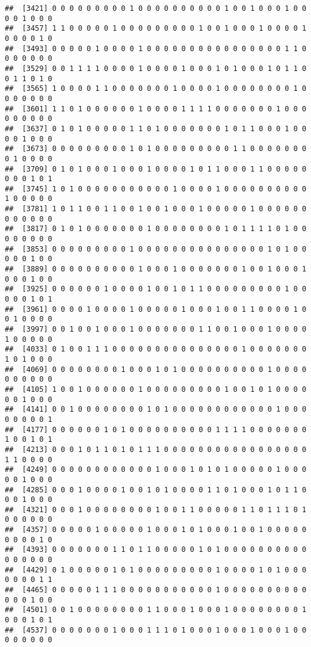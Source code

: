 \documentclass[
]{article}
\begin{document}
\begin{verbatim}
##  [3421] 0 0 0 0 0 0 0 0 0 1 0 0 0 0 0 0 0 0 0 0 1 0 0 1 0 0 0 1 0 0 0 0 1 0 0 0
##  [3457] 1 1 0 0 0 0 0 1 0 0 0 0 0 0 0 0 0 1 0 0 1 0 0 0 1 0 0 0 0 1 0 0 0 0 1 0
##  [3493] 0 0 0 0 0 1 0 0 0 0 1 0 0 0 0 0 0 0 0 0 0 0 0 0 0 0 0 1 1 0 0 0 0 0 0 0
##  [3529] 0 0 1 1 1 1 0 0 0 0 1 0 0 0 0 1 0 0 0 1 0 1 0 0 0 1 0 1 1 0 0 1 1 0 1 0
##  [3565] 1 0 0 0 0 1 1 0 0 0 0 0 0 0 1 0 0 0 0 1 0 0 0 0 0 0 0 0 1 0 0 0 0 0 0 0
##  [3601] 1 1 0 1 0 0 0 0 0 0 1 0 0 0 0 1 1 1 1 0 0 0 0 0 0 0 1 0 0 0 0 0 0 0 0 0
##  [3637] 0 1 0 1 0 0 0 0 0 1 1 0 1 0 0 0 0 0 0 0 1 0 1 1 0 0 0 1 0 0 0 0 1 0 0 0
##  [3673] 0 0 0 0 0 0 0 0 0 1 0 1 0 0 0 0 0 0 0 0 0 1 1 0 0 0 0 0 0 0 0 1 0 0 0 0
##  [3709] 0 1 0 1 0 0 0 1 0 0 0 1 0 0 0 0 1 0 1 1 0 0 0 1 1 0 0 0 0 0 0 0 0 1 0 1
##  [3745] 1 0 1 0 0 0 0 0 0 0 0 0 0 0 1 0 0 0 0 1 0 0 0 0 0 0 0 0 0 0 1 0 0 0 0 0
##  [3781] 1 0 1 1 0 0 1 1 0 0 1 0 0 1 0 0 0 1 0 0 0 0 0 1 0 0 0 0 0 0 0 0 0 0 0 0
##  [3817] 0 1 0 1 0 0 0 0 0 0 0 1 0 0 0 0 0 0 0 0 1 0 1 1 1 1 0 1 0 0 0 0 0 0 0 0
##  [3853] 0 0 0 0 0 0 0 0 0 1 0 0 0 0 0 0 0 0 0 0 0 0 0 0 0 1 0 1 0 0 0 0 0 1 0 0
##  [3889] 0 0 0 0 0 0 0 0 0 0 1 0 0 0 1 0 0 0 0 0 0 0 1 0 0 1 0 0 0 1 0 0 0 1 0 0
##  [3925] 0 0 0 0 0 0 1 0 0 0 0 1 0 0 1 0 1 1 0 0 0 0 0 0 0 0 0 1 0 0 0 0 0 1 0 1
##  [3961] 0 0 0 0 1 0 0 0 0 1 0 0 0 0 0 1 0 0 0 1 0 0 1 1 0 0 0 0 1 0 0 1 0 0 0 0
##  [3997] 0 0 1 0 0 1 0 0 0 1 0 0 0 0 0 0 0 1 1 0 0 1 0 0 0 1 0 0 0 0 1 0 0 0 0 0
##  [4033] 0 1 0 0 1 1 1 0 0 0 0 0 0 0 0 0 0 0 0 0 0 0 1 0 0 0 0 0 0 0 1 0 1 0 0 0
##  [4069] 0 0 0 0 0 0 0 0 1 0 0 0 1 0 1 0 0 0 0 0 0 0 0 0 0 1 0 0 0 0 0 0 0 0 0 0
##  [4105] 1 0 0 1 0 0 0 0 0 0 1 0 0 0 0 0 0 0 0 0 1 0 0 1 0 1 0 0 0 0 0 0 1 0 0 0
##  [4141] 0 0 1 0 0 0 0 0 0 0 0 1 0 1 0 0 0 0 0 0 0 0 0 0 0 0 1 0 0 0 0 0 0 0 0 1
##  [4177] 0 0 0 0 0 0 1 0 1 0 0 0 0 0 0 0 0 0 0 1 1 1 1 0 0 0 0 0 0 0 1 0 0 1 0 1
##  [4213] 0 0 0 1 0 1 1 0 1 0 1 1 1 0 0 0 0 0 0 0 0 0 0 0 0 0 0 0 0 0 1 1 0 0 0 0
##  [4249] 0 0 0 0 0 0 0 0 0 0 0 0 1 0 0 0 1 0 1 0 1 0 0 0 0 0 1 0 0 0 0 0 1 0 0 0
##  [4285] 0 0 0 1 0 0 0 0 1 0 0 1 0 1 0 0 0 0 1 1 0 1 0 0 0 1 0 1 1 0 0 0 1 0 0 0
##  [4321] 0 0 0 1 0 0 0 0 0 0 0 0 1 0 0 1 1 0 0 0 0 0 1 1 0 1 1 1 0 1 0 0 0 0 0 0
##  [4357] 0 0 0 0 0 1 0 0 0 0 0 1 0 0 0 1 0 1 0 0 0 1 0 0 1 0 0 0 0 0 0 0 0 0 1 0
##  [4393] 0 0 0 0 0 0 0 1 1 0 1 1 0 0 0 0 0 1 0 1 0 0 0 0 0 0 0 0 0 0 0 0 0 0 0 0
##  [4429] 0 1 0 0 0 0 0 1 0 1 0 0 0 0 0 0 0 0 0 1 0 0 0 0 1 0 1 0 0 0 0 0 0 0 1 1
##  [4465] 0 0 0 0 0 1 1 1 0 0 0 0 0 0 0 0 0 0 0 1 0 0 0 0 0 0 0 0 0 0 0 0 0 1 0 0
##  [4501] 0 0 1 0 0 0 0 0 0 0 0 1 1 0 0 0 1 0 0 0 1 0 0 0 0 0 0 0 0 1 0 0 0 1 0 1
##  [4537] 0 0 0 0 0 0 0 1 0 0 0 1 1 1 0 1 0 0 0 1 0 0 0 1 0 0 0 1 0 0 0 0 0 0 0 0

\end{verbatim}
\end{document}
